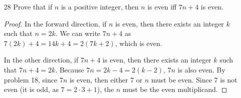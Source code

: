 \documentclass{article}
\begin{document}
\begin{itemize}
\begin{proof}
      exist integers $x$ and $y$ such that $m=2x+1$ and $n=2y+1$. Then
      $mn = (2x+1)(2y+1) = 4xy + 2x + 2y + 1 = 2(2xy + x + y) + 1$, and since
      $2xy + x + y$ is an integer, the product is even---a contradiction! Thus,
      at least one of $m$ or $n$ must be even.
    \end{proof}
  \item[28] Prove that if $n$ is a positive integer, then $n$ is even iff
    $7n+4$ is even. 
    \begin{proof}
      In the forward direction, if $n$ is even, then there exists an integer
      $k$ such that $n=2k$. We can write $7n+4$ as $7(2k)+4=14k+4=2(7k+2)$,
      which is even.

      In the other direction, if $7n+4$ is even, then there exists an integer
      $k$ such that $7n+4=2k$. Because $7n=2k-4=2(k-2)$, $7n$ is also even.
      By problem 18, since $7n$ is even, then either 7 or $n$ must be even.
      Since 7 is not even (it is odd, as $7=2\cdot3+1$), the $n$ must be the
      even multiplicand.
    \end{proof}
\end{itemize}
\end{document}
